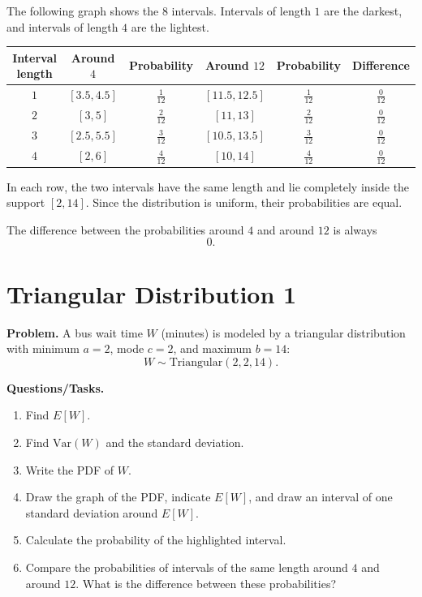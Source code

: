 \begin{enumerate}[label=\textbf{\alph*)}]
	The following graph shows the \(8\) intervals. Intervals of length \(1\) are the darkest, and intervals of length \(4\) are the lightest.
	
	
	\begin{center}
		\begin{tabular}{c c c c c c}
			\hline
			Interval length & Around \(4\) & Probability & Around \(12\) & Probability & Difference \\
			\hline
			\(1\) & \([3.5,4.5]\) & \(\frac{1}{12}\) & \([11.5,12.5]\) & \(\frac{1}{12}\) & \(\frac{0}{12}\) \\
			\(2\) & \([3,5]\) & \(\frac{2}{12}\) & \([11,13]\) & \(\frac{2}{12}\) & \(\frac{0}{12}\) \\
			\(3\) & \([2.5,5.5]\) & \(\frac{3}{12}\) & \([10.5,13.5]\) & \(\frac{3}{12}\) & \(\frac{0}{12}\) \\
			\(4\) & \([2,6]\) & \(\frac{4}{12}\) & \([10,14]\) & \(\frac{4}{12}\) & \(\frac{0}{12}\) \\
			\hline
		\end{tabular}
	\end{center}
	
	In each row, the two intervals have the same length and lie completely inside the support \([2,14]\). Since the distribution is uniform, their probabilities are equal.
	
	The difference between the probabilities around \(4\) and around \(12\) is always
	\[
	0.
	\]
	
\end{enumerate}

\section{Triangular Distribution 1}

\textbf{Problem.}
A bus wait time \(W\) (minutes) is modeled by a triangular distribution with minimum \(a=2\), mode \(c=2\), and maximum \(b=14\):
\[
W\sim \text{Triangular}(2,2,14).
\]

\textbf{Questions/Tasks.}
\begin{enumerate}[label=\textbf{\alph*)}]
	\item Find \(E[W]\).
	\item Find \(\mathrm{Var}(W)\) and the standard deviation.
	\item Write the PDF of \(W\).
	\item Draw the graph of the PDF, indicate \(E[W]\), and draw an interval of one standard deviation around \(E[W]\).
	\item Calculate the probability of the highlighted interval.
	\item Compare the probabilities of intervals of the same length around \(4\) and around \(12\). What is the difference between these probabilities?
\end{enumerate}

